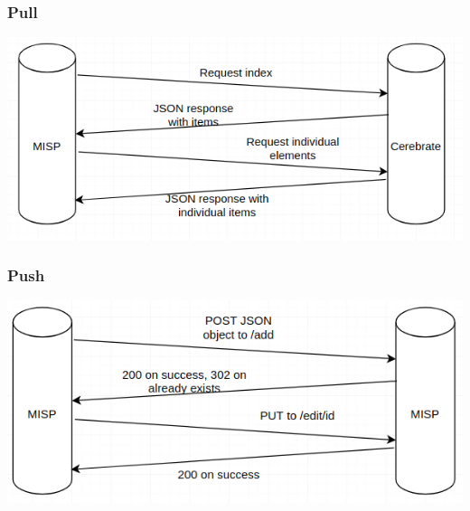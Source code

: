 \begin{frame}
  \frametitle{Pull}
  \begin{center}
    \includegraphics[scale=0.5]{pull.png}
  \end{center}
\end{frame}

\begin{frame}
  \frametitle{Push}
  \begin{center}
    \includegraphics[scale=0.5]{push.png}
  \end{center}
\end{frame}

